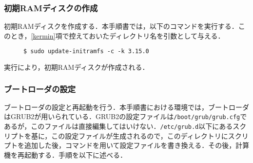 \documentclass[12pt]{jsarticle}
\begin{document}
\subsubsection{初期RAMディスクの作成}
初期RAMディスクを作成する．本手順書では，以下のコマンドを実行する．このとき，\ref{kermin}項で控えておいたディレクトリ名を引数として与える．
\begin{description}
\item[] \verb|$ sudo update-initramfs -c -k 3.15.0|
\end{description}
実行により，初期RAMディスクが作成される．
\subsubsection{ブートローダの設定}
ブートローダの設定と再起動を行う．本手順書における環境では，ブートローダはGRUB2が用いられている．GRUB2の設定ファイルは\verb|/boot/grub/grub.cfg|であるが，このファイルは直接編集してはいけない．\verb|/etc/grub.d|以下にあるスクリプトを基に，この設定ファイルが生成されるので，このディレクトリにスクリプトを追加した後，コマンドを用いて設定ファイルを書き換える．その後，計算機を再起動する．手順を以下に述べる．
\end{document}
